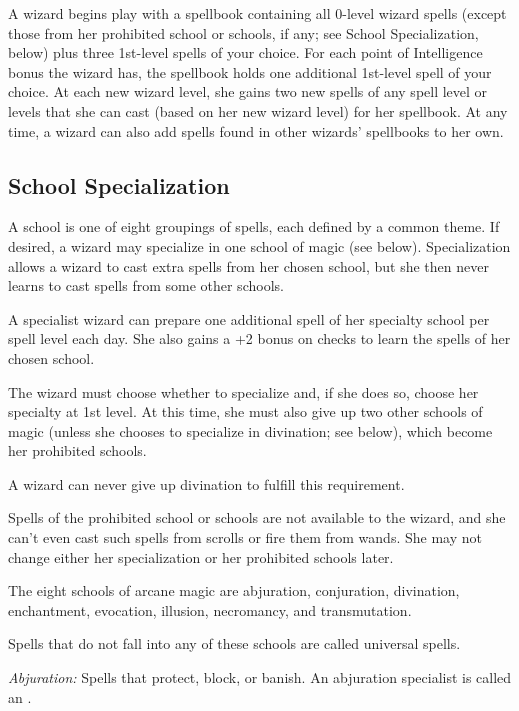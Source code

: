 A wizard begins play with a spellbook containing all 0-level wizard spells (except those from her prohibited school or schools, if any; see School Specialization, below) plus three 1st-level spells of your choice. For each point of Intelligence bonus the wizard has, the spellbook holds one additional 1st-level spell of your choice. At each new wizard level, she gains two new spells of any spell level or levels that she can cast (based on her new wizard level) for her spellbook. At any time, a wizard can also add spells found in other wizards' spellbooks to her own.

\subsection{School Specialization}

A school is one of eight groupings of spells, each defined by a common theme. If desired, a wizard may specialize in one school of magic (see below). Specialization allows a wizard to cast extra spells from her chosen school, but she then never learns to cast spells from some other schools.

A specialist wizard can prepare one additional spell of her specialty school per spell level each day. She also gains a +2 bonus on  checks to learn the spells of her chosen school.

The wizard must choose whether to specialize and, if she does so, choose her specialty at 1st level. At this time, she must also give up two other schools of magic (unless she chooses to specialize in divination; see below), which become her prohibited schools.

A wizard can never give up divination to fulfill this requirement.

Spells of the prohibited school or schools are not available to the wizard, and she can't even cast such spells from scrolls or fire them from wands. She may not change either her specialization or her prohibited schools later.

The eight schools of arcane magic are abjuration, conjuration, divination, enchantment, evocation, illusion, necromancy, and transmutation.

Spells that do not fall into any of these schools are called universal spells.

\textit{Abjuration:} Spells that protect, block, or banish. An abjuration specialist is called an .


